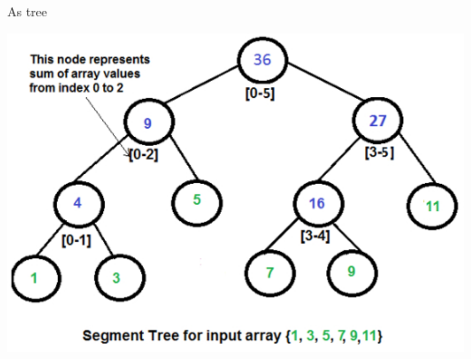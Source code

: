 \documentclass[presentation,12pt]{beamer}
\begin{document}
\begin{frame}[label={sec:org677df1e}]{As tree}
\begin{center}
\includegraphics[width=.9\linewidth]{./img/segtree.jpg}
\end{center}
\end{frame}
\end{document}
